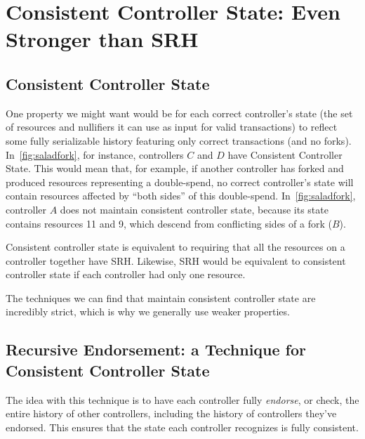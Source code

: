 \documentclass[a4paper,USenglish,cleveref, autoref, thm-restate, anonymous]{lipics-v2021}
\begin{document}
\section{Consistent Controller State: Even Stronger than SRH}
\label{sec:consistentcontrollerstate}
\subsection{Consistent Controller State}
One property we might want would be for each correct controller's state (the set of resources and nullifiers it can use as input for valid transactions) to reflect some fully serializable history featuring only correct transactions (and no forks). 
In~\cref{fig:saladfork}, for instance, controllers $C$ and $D$ have Consistent Controller State.
This would mean that, for example, if another controller has forked and produced resources representing a double-spend, no correct controller's state will contain resources affected by ``both sides'' of this double-spend.
In~\cref{fig:saladfork}, controller $A$ does not maintain consistent controller state, because its state contains resources 11 and 9, which descend from conflicting sides of a fork ($B$).

Consistent controller state is equivalent to requiring that all the resources on a controller together have SRH.
Likewise, SRH would be equivalent to consistent controller state if each controller had only one resource.

The techniques we can find that maintain consistent controller state are incredibly strict, which is why we generally use weaker properties.

\subsection{Recursive Endorsement: a Technique for Consistent Controller State}
The idea with this technique is to have each controller fully \textit{endorse}, or check, the entire history of other controllers, including the history of controllers they've endorsed.
This ensures that the state each controller recognizes is fully consistent.
\end{document}
